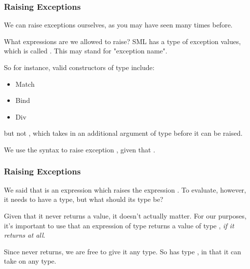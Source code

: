 \documentclass[aspectratio=169]{beamer}
\begin{document}
\begin{frame}[fragile]
  \frametitle{Raising Exceptions}

  We can raise exceptions ourselves, as you may have seen many times before.

  \vspace{\fill}

  What expressions are we allowed to raise? SML has a type of exception values,
  which is called . This may stand for "exception name". 

  \vspace{\fill}

  So for instance, valid constructors of type  include:
  \begin{itemize}
    \item Match 
    \item Bind 
    \item Div
  \end{itemize}

  but not , which takes in an additional argument
  of type  before it can be raised. 

  \vspace{\fill}

  We use the syntax  to raise exception , given that
  . 

  \vspace{\fill}

\end{frame}

\begin{frame}[fragile]
  \frametitle{Raising Exceptions}

  We said that  is an expression which raises the expression
  . To evaluate, however, it needs to have a type, but what should
  its type be?

  \vspace{\fill}

  Given that it never returns a value, it doesn't actually matter. For our
  purposes, it's important to use that an expression of type  
  returns a value of type , \textit{if it returns at all}.

  \vspace{\fill}

  Since  never returns, we are free to give it any type. So
   has type , in that it can take on any type. 
\end{frame}
\end{document}
